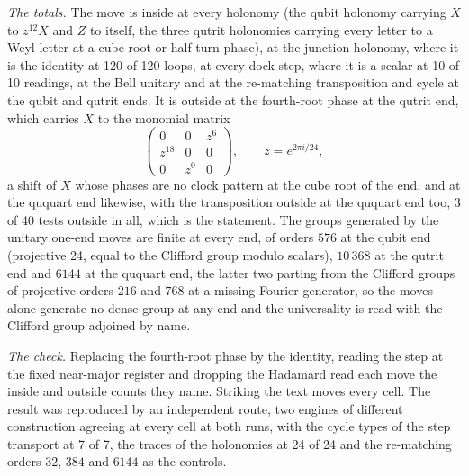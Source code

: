 \begin{chproof}
\textit{The totals.} The move is inside at every holonomy (the qubit holonomy carrying $X$ to $z^{12}X$ and $Z$ to itself, the three qutrit holonomies carrying every letter to a Weyl letter at a cube-root or half-turn phase), at the junction holonomy, where it is the identity at 120 of 120 loops, at every dock step, where it is a scalar at 10 of 10 readings, at the Bell unitary and at the re-matching transposition and cycle at the qubit and qutrit ends. It is outside at the fourth-root phase at the qutrit end, which carries $X$ to the monomial matrix
\begin{equation}
\begin{pmatrix}0&0&z^{6}\\ z^{18}&0&0\\ 0&z^{0}&0\end{pmatrix},\qquad z=e^{2\pi i/24},
\end{equation}
a shift of $X$ whose phases are no clock pattern at the cube root of the end, and at the ququart end likewise, with the transposition outside at the ququart end too, 3 of 40 tests outside in all, which is the statement. The groups generated by the unitary one-end moves are finite at every end, of orders $576$ at the qubit end (projective 24, equal to the Clifford group modulo scalars), $10\,368$ at the qutrit end and $6144$ at the ququart end, the latter two parting from the Clifford groups of projective orders $216$ and $768$ at a missing Fourier generator, so the moves alone generate no dense group at any end and the universality is read with the Clifford group adjoined by name.

\textit{The check.} Replacing the fourth-root phase by the identity, reading the step at the fixed near-major register and dropping the Hadamard read each move the inside and outside counts they name. Striking the text moves every cell. The result was reproduced by an independent route, two engines of different construction agreeing at every cell at both runs, with the cycle types of the step transport at 7 of 7, the traces of the holonomies at 24 of 24 and the re-matching orders $32$, $384$ and $6144$ as the controls.
\end{chproof}

